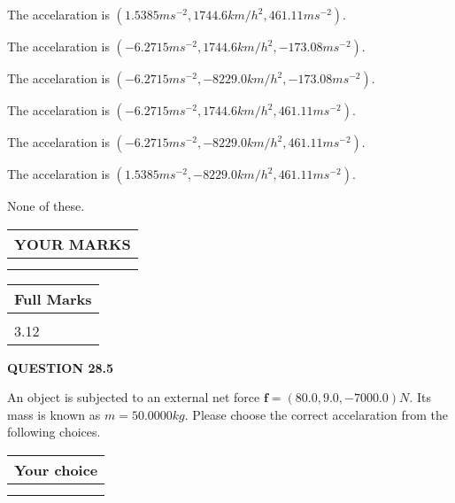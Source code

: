 \documentclass[12pt]{article}
\begin{document}
  
 
 
The accelaration is
$(
1.5385ms^{-2},
1744.6km/h^2,
461.11ms^{-2}
).
$
 
 
The accelaration is
$(
-6.2715ms^{-2},
1744.6km/h^2,
-173.08ms^{-2}
).
$
 
 
The accelaration is
$(
-6.2715ms^{-2},
-8229.0km/h^2,
-173.08ms^{-2}
).
$
 
 
The accelaration is
$(
-6.2715ms^{-2},
1744.6km/h^2,
461.11ms^{-2}
).
$
 
 
The accelaration is
$(
-6.2715ms^{-2},
-8229.0km/h^2,
461.11ms^{-2}
).
$
 
 
The accelaration is
$(
1.5385ms^{-2},
-8229.0km/h^2,
461.11ms^{-2}
).
$
 
 
 None of these.
 
 
 
 

 
\vspace{0.3in}
  
\vspace{0.2in}
  
\noindent\begin{tabular}{|l|}
\hline
 YOUR MARKS  \\
\hline
 \\ 
 \\ 
\hline
\end{tabular}
\hspace{0.05in} \begin{tabular}{|l|}
\hline
 Full Marks  \\
\hline
 \\ 
3.12 \\
\hline
\end{tabular}
{\textbf{\Large{QUESTION
28.5 
}}}
  
  
 
 
An object is subjected to an external net force $\mathbf{f}=
(80.0 , 9.0 , -7000.0) N$.
Its mass is known as $m= %
50.0000 kg$. Please choose the
correct accelaration from the following choices.
 
  
  
\noindent\hspace{3.0in} \begin{tabular}{|l|}
\hline
Your choice \\
\hline
 \\ 
 \\ 
\hline
\end{tabular}
  
\end{document}
